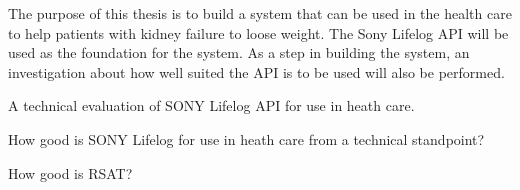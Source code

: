 \documentclass{cslthse-msc}
\begin{document}
The purpose of this thesis is to build a system that can be used in the health care to help patients with kidney failure to loose weight. The Sony Lifelog API will be used as the foundation for the system. As a step in building the system, an investigation about how well suited the API is to be used will also be performed. 



A technical evaluation of SONY Lifelog API for use in heath care.

How good is SONY Lifelog  for use in heath care from a technical standpoint?

How good is RSAT?

\end{document}
